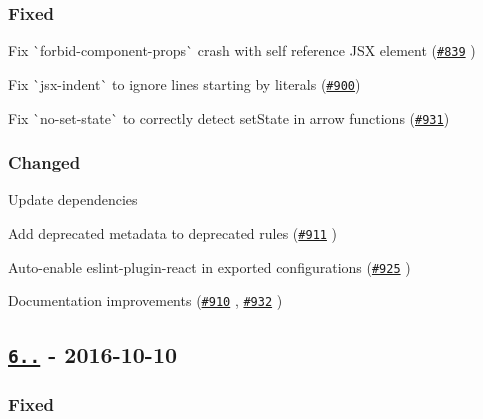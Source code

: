 \subsubsection*{Fixed}


\begin{DoxyItemize}
\item Fix \`{}forbid-\/component-\/props\`{} crash with self reference J\+SX element (\href{https://github.com/yannickcr/eslint-plugin-react/pull/839}{\tt \#839} )
\item Fix \`{}jsx-\/indent\`{} to ignore lines starting by literals (\href{https://github.com/yannickcr/eslint-plugin-react/issues/900}{\tt \#900})
\item Fix \`{}no-\/set-\/state\`{} to correctly detect {\ttfamily set\+State} in arrow functions (\href{https://github.com/yannickcr/eslint-plugin-react/issues/931}{\tt \#931})
\end{DoxyItemize}

\subsubsection*{Changed}


\begin{DoxyItemize}
\item Update dependencies
\item Add {\ttfamily deprecated} metadata to deprecated rules (\href{https://github.com/yannickcr/eslint-plugin-react/pull/911}{\tt \#911} )
\item Auto-\/enable {\ttfamily eslint-\/plugin-\/react} in exported configurations (\href{https://github.com/yannickcr/eslint-plugin-react/pull/925}{\tt \#925} )
\item Documentation improvements (\href{https://github.com/yannickcr/eslint-plugin-react/pull/910}{\tt \#910} , \href{https://github.com/yannickcr/eslint-plugin-react/pull/932}{\tt \#932} )
\end{DoxyItemize}

\subsection*{\href{https://github.com/yannickcr/eslint-plugin-react/compare/v6.4.0...v6.4.1}{\tt 6..} -\/ 2016-\/10-\/10}

\subsubsection*{Fixed}


